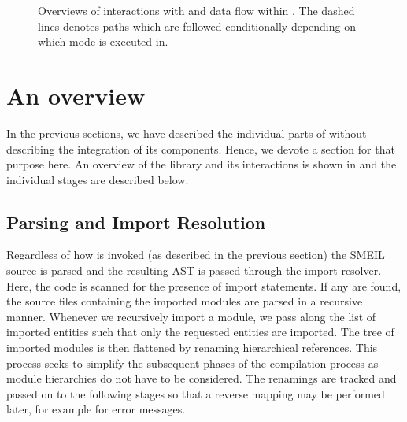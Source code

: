 \begin{figure}
{
  }
  \caption{Overviews of interactions with and data flow within \libsme{}. The
    dashed lines denotes paths which are followed conditionally depending on
    which mode \libsme{} is executed in.}
  \label{fig:overview}
\end{figure}

\section{An overview}
\label{sec:overview}
In the previous sections, we have described the individual parts of \libsme{}
without describing the integration of its components. Hence, we devote a section
for that purpose here. An overview of the \libsme{} library and its interactions
is shown in  and the individual stages are described below.

\subsection{Parsing and Import Resolution} Regardless of how \libsme{} is
invoked (as described in the previous section) the SMEIL source is parsed and
the resulting AST is passed through the import resolver. Here, the code is
scanned for the presence of {\ttfamily import} statements. If any are found, the source
files containing the imported modules are parsed in a recursive manner. Whenever
we recursively import a module, we pass along the list of imported entities such
that only the requested entities are imported. The tree of imported modules is
then flattened by renaming hierarchical references. This process seeks to
simplify the subsequent phases of the compilation process as module hierarchies
do not have to be considered. The renamings are tracked and passed on to the
following stages so that a reverse mapping may be performed later, for example
for error messages.

